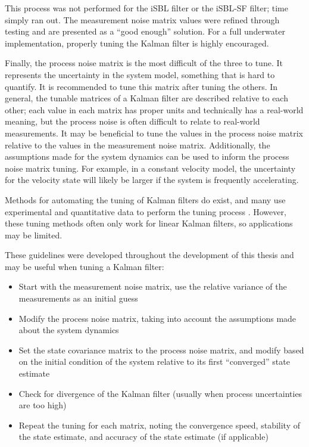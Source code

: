 \documentclass[11pt]{ucthesisCP}
\begin{document}
This process was not performed for the iSBL filter or the iSBL-SF filter; time simply ran out. The measurement noise matrix values were refined through testing and are presented as a “good enough” solution. For a full underwater implementation, properly tuning the Kalman filter is highly encouraged.

Finally, the process noise matrix is the most difficult of the three to tune. It represents the uncertainty in the system model, something that is hard to quantify. It is recommended to tune this matrix after tuning the others. In general, the tunable matrices of a Kalman filter are described relative to each other; each value in each matrix has proper units and technically has a real-world meaning, but the process noise is often difficult to relate to real-world measurements. It may be beneficial to tune the values in the process noise matrix relative to the values in the measurement noise matrix. Additionally, the assumptions made for the system dynamics can be used to inform the process noise matrix tuning. For example, in a constant velocity model, the uncertainty for the velocity state will likely be larger if the system is frequently accelerating.

Methods for automating the tuning of Kalman filters do exist, and many use experimental and quantitative data to perform the tuning process \cite{kftuning}. However, these tuning methods often only work for linear Kalman filters, so applications may be limited. 

These guidelines were developed throughout the development of this thesis and may be useful when tuning a Kalman filter:
\begin{itemize}[noitemsep,topsep=0pt,]
	\item Start with the measurement noise matrix, use the relative variance of the measurements as an initial guess
	\item Modify the process noise matrix, taking into account the assumptions made about the system dynamics
	\item Set the state covariance matrix to the process noise matrix, and modify based on the initial condition of the system relative to its first “converged” state estimate
	\item Check for divergence of the Kalman filter (usually when process uncertainties are too high)
	\item Repeat the tuning for each matrix, noting the convergence speed, stability of the state estimate, and accuracy of the state estimate (if applicable)
\end{itemize}
\end{document}
